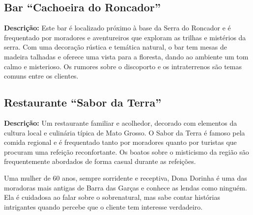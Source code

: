 {}

\subsection{Bar ``Cachoeira do Roncador''}
\textbf{Descrição:}  
Este bar é localizado próximo à base da Serra do Roncador e é frequentado por moradores e aventureiros que exploram as trilhas e mistérios da serra. Com uma decoração rústica e temática natural, o bar tem mesas de madeira talhadas e oferece uma vista para a floresta, dando ao ambiente um tom calmo e misterioso. Os rumores sobre o discoporto e os intraterrenos são temas comuns entre os clientes.









\subsection{Restaurante ``Sabor da Terra''}
\textbf{Descrição:}  
Um restaurante familiar e acolhedor, decorado com elementos da cultura local e culinária típica de Mato Grosso. O Sabor da Terra é famoso pela comida regional e é frequentado tanto por moradores quanto por turistas que procuram uma refeição reconfortante. Os boatos sobre o misticismo da região são frequentemente abordados de forma casual durante as refeições.

{Uma mulher de 60 anos, sempre sorridente e receptiva, Dona Dorinha é uma das moradoras mais antigas de Barra das Garças e conhece as lendas como ninguém. Ela é cuidadosa ao falar sobre o sobrenatural, mas sabe contar histórias intrigantes quando percebe que o cliente tem interesse verdadeiro.}
{}


